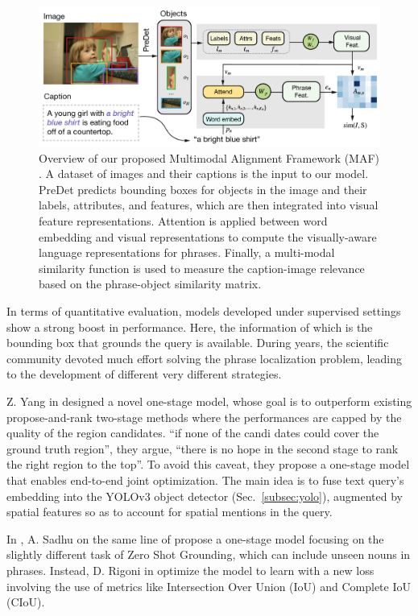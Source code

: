 \begin{figure}
  \centering
  \includegraphics[width=.8\textwidth]{figures/maf-model.png}
  \caption[Multimodal Alignment Framework model overview]{Overview
  of our proposed Multimodal Alignment Framework (MAF)
  \cite{wang2020maf}. A dataset of images and their captions is the
  input to our model. PreDet predicts bounding boxes for objects in
  the image and their labels, attributes, and features, which are
  then integrated into visual feature representations. Attention is
  applied between word embedding and visual representations to
  compute the visually-aware language representations for phrases.
  Finally, a multi-modal similarity function is used to measure the
  caption-image relevance based on the phrase-object similarity
  matrix.}
  \label{fig:maf-model}
\end{figure}

In terms of quantitative evaluation, models developed under supervised
settings show a strong boost in performance. Here, the information of
which is the bounding box that grounds the query is available. During
years, the scientific community devoted much effort solving the phrase
localization problem, leading to the development of different very
different strategies. 

Z. Yang \etal{} in \cite{yang2019fast} designed a novel one-stage
model, whose goal is to outperform existing propose-and-rank two-stage
methods where the performances are capped by the quality of the region
candidates. ``if none of the candi dates could cover the ground truth
region'', they argue, ``there is no hope in the second stage to rank
the right region to the top''. To avoid this caveat, they propose a
one-stage model that enables end-to-end joint optimization. The main
idea is to fuse text query's embedding into the YOLOv3 object detector
(Sec.~\ref{subsec:yolo}), augmented by spatial features so as to
account for spatial mentions in the query. 

In , A. Sadhu \etal{}
on the same line of  propose
a one-stage model focusing on the slightly different task of Zero Shot
Grounding, which can include unseen nouns in phrases. Instead, D.
Rigoni \etal{} in  optimize the model to
learn with a new loss involving the use of metrics like Intersection
Over Union (IoU) and Complete IoU (CIoU).

